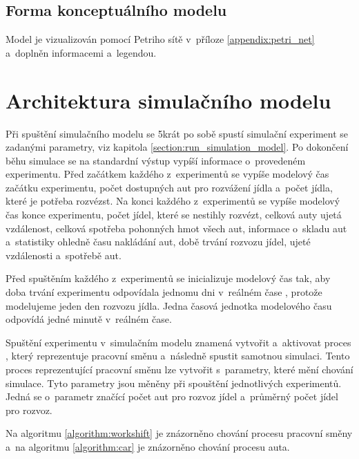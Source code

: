 \documentclass[a4paper, 11pt]{article}
\begin{document}
	\subsection{Forma konceptuálního modelu}

	Model je vizualizován pomocí Petriho sítě v~příloze
	\ref{appendix:petri_net} a~doplněn informacemi a~legendou.



	\section{Architektura simulačního modelu}
	\label{section:simulation_model_architecture}

	Při spuštění simulačního modelu \cite[snímek 44]{IMS_slides} se 5krát
	po sobě spustí simulační experiment se zadanými parametry,
	viz kapitola \ref{section:run_simulation_model}. Po dokončení
	běhu simulace se na standardní výstup vypíší informace o~provedeném
	experimentu. Před začátkem každého z~experimentů se vypíše modelový
	čas \cite[snímek 21]{IMS_slides} začátku experimentu, počet dostupných
	aut pro rozvážení jídla a~počet jídla, které je potřeba rozvézst. Na
	konci každého z~experimentů se vypíše modelový čas konce experimentu,
	počet jídel, které se nestihly rozvézt, celková auty ujetá vzdálenost,
	celková spotřeba pohonných hmot všech aut, informace o~skladu
	\cite[snímek 184]{IMS_slides} aut a~statistiky ohledně času nakládání aut,
	době trvání rozvozu jídel, ujeté vzdálenosti a~spotřebě aut.

	Před spuštěním každého z~experimentů se inicializuje modelový čas tak, aby
	doba trvání experimentu odpovídala jednomu dni v~reálném čase
	\cite[snímek 21]{IMS_slides}, protože modelujeme jeden den rozvozu jídla.
	Jedna časová jednotka modelového času odpovídá jedné minutě v~reálném
	čase.

	Spuštění experimentu v~simulačním modelu znamená vytvořit a~aktivovat
	proces \cite[snímek 121]{IMS_slides}, který reprezentuje pracovní směnu
	a~následně spustit samotnou simulaci. Tento proces reprezentující
	pracovní směnu lze vytvořit s~parametry, které mění chování simulace.
	Tyto parametry jsou měněny při spouštění jednotlivých experimentů. Jedná
	se o~parametr značící počet aut pro rozvoz jídel a~průměrný počet jídel
	pro rozvoz.

	Na algoritmu \ref{algorithm:workshift} je znázorněno chování procesu
	pracovní směny a~na algoritmu \ref{algorithm:car} je znázorněno chování
	procesu auta. \\
\end{document}
